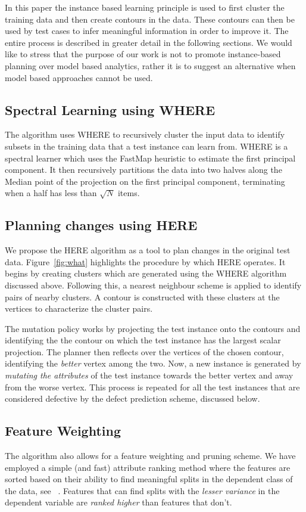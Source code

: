 \documentclass[conference]{IEEEtran}
\begin{document}
In this paper the instance based learning principle is used to first cluster the training data and then create contours in the data. These contours can then be used by test cases to infer meaningful information in order to improve it. The entire process is described in greater detail in the following sections. We would like to stress that the purpose of our work is not to promote instance-based planning over model based analytics, rather it is to suggest an alternative when model based approaches cannot be used.

\subsection{Spectral Learning using WHERE}
The algorithm uses WHERE to recursively cluster the input data to identify subsets in the training data that a test instance can learn from. WHERE is a spectral learner which uses the FastMap heuristic to estimate the first principal component. It then recursively partitions the data into two halves along the Median point of the projection on the first principal component, terminating when a half has less than $\sqrt{N}$ items.   

\subsection{Planning changes using HERE}
We propose the HERE algorithm as a tool to plan changes in the original test data. Figure~\ref{fig:what} highlights the procedure by which HERE operates. It begins by creating clusters which are generated using the WHERE algorithm discussed above. Following this, a nearest neighbour scheme is applied to identify pairs of nearby clusters. A contour is constructed with these clusters at the vertices to characterize the cluster pairs.

The mutation policy works by projecting the test instance onto the contours and identifying the the contour on which the test instance has the largest scalar projection. The planner then reflects over the vertices of the chosen contour, identifying the \textit{better} vertex among the two. Now, a new instance is generated by \textit{mutating the attributes} of the test instance towards the better vertex and away from the worse vertex. This process is repeated for all the test instances that are considered defective by the defect prediction scheme, discussed below.

\subsection{Feature Weighting} \label{fwt}
The algorithm also allows for a feature weighting and pruning scheme. We have employed a simple (and fast) attribute ranking method where the features are sorted based on their ability to find meaningful splits in the dependent class of the data, see ~\cite{hall03}. Features that can find splits with the \textit{lesser variance} in the dependent variable are \textit{ranked higher} than features that don't. 
\end{document}

